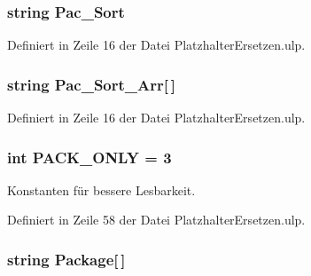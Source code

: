 \subsubsection[{Pac\+\_\+\+Sort}]{\setlength{\rightskip}{0pt plus 5cm}string Pac\+\_\+\+Sort}\label{_platzhalter_ersetzen_8ulp_a9658b6387aed3b22f25a8be98530d385}


Definiert in Zeile 16 der Datei Platzhalter\+Ersetzen.\+ulp.

\hypertarget{_platzhalter_ersetzen_8ulp_a619ea3d31ff34b29c397408d7a72e2aa}{}
\subsubsection[{Pac\+\_\+\+Sort\+\_\+\+Arr}]{\setlength{\rightskip}{0pt plus 5cm}string Pac\+\_\+\+Sort\+\_\+\+Arr\mbox{[}$\,$\mbox{]}}\label{_platzhalter_ersetzen_8ulp_a619ea3d31ff34b29c397408d7a72e2aa}


Definiert in Zeile 16 der Datei Platzhalter\+Ersetzen.\+ulp.

\hypertarget{_platzhalter_ersetzen_8ulp_a70ca181c5a9a77b7c4f1499f2fc6af3e}{}
\subsubsection[{P\+A\+C\+K\+\_\+\+O\+N\+L\+Y}]{\setlength{\rightskip}{0pt plus 5cm}int P\+A\+C\+K\+\_\+\+O\+N\+L\+Y = 3}\label{_platzhalter_ersetzen_8ulp_a70ca181c5a9a77b7c4f1499f2fc6af3e}


Konstanten für bessere Lesbarkeit. 



Definiert in Zeile 58 der Datei Platzhalter\+Ersetzen.\+ulp.

\hypertarget{_platzhalter_ersetzen_8ulp_a36b57fe679881487796855a589fbfb85}{}
\subsubsection[{Package}]{\setlength{\rightskip}{0pt plus 5cm}string Package\mbox{[}$\,$\mbox{]}}\label{_platzhalter_ersetzen_8ulp_a36b57fe679881487796855a589fbfb85}


